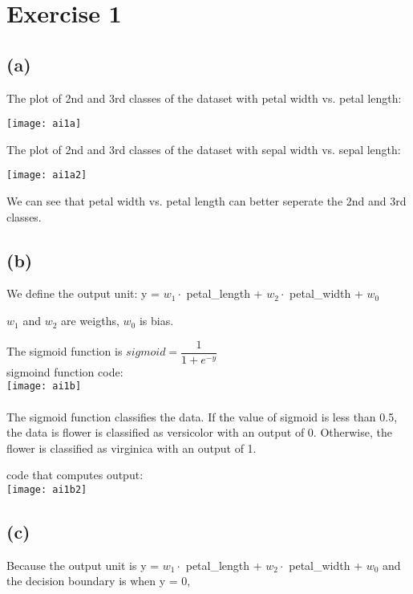 \documentclass[11pt]{article}
\begin{document}
\section*{Exercise 1}

\subsection*{(a)}

The plot of 2nd and 3rd classes of the dataset with petal width vs. petal length:

\texttt{[image: ai1a]}

The plot of 2nd and 3rd classes of the dataset with sepal width vs. sepal length:

\texttt{[image: ai1a2]}

We can see that petal width vs. petal length can better seperate the 2nd and 3rd classes.

\subsection*{(b)}

We define the output unit: y = $w_1 \cdot$ petal\_length + $w_2 \cdot$ petal\_width + $w_0$

$w_1$ and $w_2$ are weigths, $w_0$ is bias.

The sigmoid function is $sigmoid = \dfrac{1}{1 + e^{-y}}$\\

sigmoind function code:\\

\texttt{[image: ai1b]}
\\\\
The sigmoid function classifies the data. If the value of sigmoid is less than 0.5, the data is flower is classified as versicolor with an output of 0.
Otherwise, the flower is classified as virginica with an output of 1. 

code that computes output:\\

\texttt{[image: ai1b2]}

\subsection*{(c)}

Because the output unit is y = $w_1 \cdot$ petal\_length + $w_2 \cdot$ petal\_width + $w_0$ and the decision boundary is when y = 0, 
\end{document}
